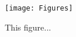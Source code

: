 \begin{figure}[H]
    \centering    \texttt{[image: Figures]}
    \caption{This figure...}
    \label{fig:}
\end{figure}

